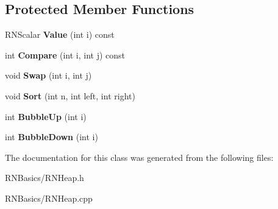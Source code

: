 \subsection*{Protected Member Functions}
\begin{DoxyCompactItemize}
\item 
R\+N\+Scalar {\bfseries Value} (int i) const \hypertarget{class_r_n_heap_add5fb1bf1a4910b020e967e593ff3198}{}\label{class_r_n_heap_add5fb1bf1a4910b020e967e593ff3198}

\item 
int {\bfseries Compare} (int i, int j) const \hypertarget{class_r_n_heap_a458c64a87f3f7d41f65f0d7e65da55bc}{}\label{class_r_n_heap_a458c64a87f3f7d41f65f0d7e65da55bc}

\item 
void {\bfseries Swap} (int i, int j)\hypertarget{class_r_n_heap_ad7969b13d330045badad211f069c7cc1}{}\label{class_r_n_heap_ad7969b13d330045badad211f069c7cc1}

\item 
void {\bfseries Sort} (int n, int left, int right)\hypertarget{class_r_n_heap_a4112e13d333fa43713e3c88212690586}{}\label{class_r_n_heap_a4112e13d333fa43713e3c88212690586}

\item 
int {\bfseries Bubble\+Up} (int i)\hypertarget{class_r_n_heap_a7ca7b29f22b247f5268b5336185c2dad}{}\label{class_r_n_heap_a7ca7b29f22b247f5268b5336185c2dad}

\item 
int {\bfseries Bubble\+Down} (int i)\hypertarget{class_r_n_heap_ad7f2f799c074b9c4ad5e7f4e9679d36e}{}\label{class_r_n_heap_ad7f2f799c074b9c4ad5e7f4e9679d36e}

\end{DoxyCompactItemize}


The documentation for this class was generated from the following files\+:\begin{DoxyCompactItemize}
\item 
R\+N\+Basics/R\+N\+Heap.\+h\item 
R\+N\+Basics/R\+N\+Heap.\+cpp\end{DoxyCompactItemize}
